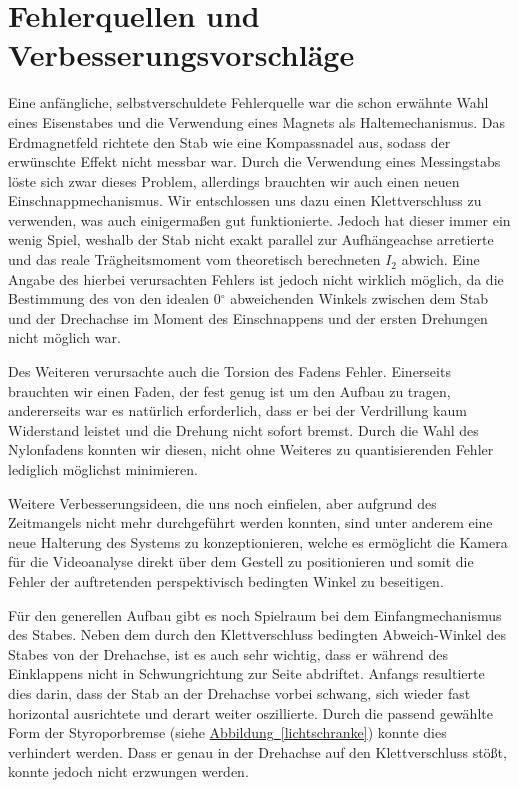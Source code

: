 \documentclass[halfparskip, 11pt]{scrartcl}
\newcommand{\degr}{\ensuremath{^\circ}}
\newcommand{\hypref}[2]{\hyperref[#2]{{#1}~\ref{#2}}}
\begin{document}
\FloatBarrier
\section{Fehlerquellen und Verbesserungsvorschläge}\label{sec:verbesserung}
Eine anfängliche, selbstverschuldete Fehlerquelle war die schon erwähnte Wahl eines Eisenstabes und die Verwendung eines Magnets als Haltemechanismus. Das Erdmagnetfeld richtete den Stab wie eine Kompassnadel aus, sodass der erwünschte Effekt nicht messbar war. Durch die Verwendung eines Messingstabs löste sich zwar dieses Problem, allerdings brauchten wir auch einen neuen Einschnappmechanismus. Wir entschlossen uns dazu einen Klettverschluss zu verwenden, was auch einigermaßen gut funktionierte. Jedoch hat dieser immer ein wenig Spiel, weshalb der Stab nicht exakt parallel zur Aufhängeachse arretierte und das reale Trägheitsmoment vom theoretisch berechneten $I_2$ abwich. Eine Angabe des hierbei verursachten Fehlers ist jedoch nicht wirklich möglich, da die Bestimmung des von den idealen $0\degr$ abweichenden Winkels zwischen dem Stab und der Drechachse im Moment des Einschnappens und der ersten Drehungen nicht möglich war.

Des Weiteren verursachte auch die Torsion des Fadens Fehler. Einerseits brauchten wir einen Faden, der fest genug ist um den Aufbau zu tragen, andererseits war es natürlich erforderlich, dass er bei der Verdrillung kaum Widerstand leistet und die Drehung nicht sofort bremst. Durch die Wahl des Nylonfadens konnten wir diesen, nicht ohne Weiteres zu quantisierenden Fehler lediglich möglichst minimieren.

Weitere Verbesserungsideen, die uns noch einfielen, aber aufgrund des Zeitmangels nicht mehr durchgeführt werden konnten, sind unter anderem eine neue Halterung des Systems zu konzeptionieren, welche es ermöglicht die Kamera für die Videoanalyse direkt über dem Gestell zu positionieren und somit die Fehler der auftretenden perspektivisch bedingten Winkel zu beseitigen.

Für den generellen Aufbau gibt es noch Spielraum bei dem Einfangmechanismus des Stabes. Neben dem durch den Klettverschluss bedingten Abweich-Winkel des Stabes von der Drehachse, ist es auch sehr wichtig, dass er während des Einklappens nicht in Schwungrichtung zur Seite abdriftet. Anfangs resultierte dies darin, dass der Stab an der Drehachse vorbei schwang, sich wieder fast horizontal ausrichtete und derart weiter oszillierte. Durch die passend gewählte Form der Styroporbremse (siehe \hypref{Abbildung}{lichtschranke}) konnte dies verhindert werden. Dass er genau in der Drehachse auf den Klettverschluss stößt, konnte jedoch nicht erzwungen werden.
\end{document}
